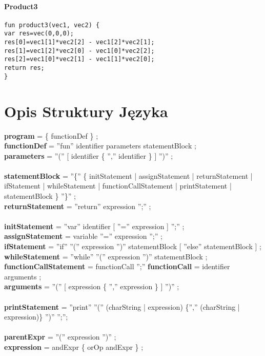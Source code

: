 \documentclass[11pt]{article} %
\begin{document}
\paragraph{Product3}
\begin{verbatim}
fun product3(vec1, vec2) {
var res=vec(0,0,0);
res[0]=vec1[1]*vec2[2] - vec1[2]*vec2[1];
res[1]=vec1[2]*vec2[0] - vec1[0]*vec2[2];
res[2]=vec1[0]*vec2[1] - vec1[1]*vec2[0];
return res;
}
\end{verbatim}

\section{Opis Struktury Języka}

\textbf{program} = \{ functionDef \} ;\\
\textbf{functionDef} = ''fun'' identifier parameters statementBlock ;\\
\textbf{parameters} = ''('' [ identifier \{ '','' identifier \} ] '')'' ;\\
\\
\textbf{statementBlock} = ''\{'' \{ initStatement | assignStatement | returnStatement |
ifStatement | whileStatement | functionCallStatement |  printStatement | statementBlock \} ''\}'' ;\\
\textbf{returnStatement} = ''return'' expression '';'' ;\\
\\
\textbf{initStatement} = ''var'' identifier [ ''='' expression ] '';'' ;\\
\textbf{assignStatement} = variable ''='' expression '';'' ;\\
\textbf{ifStatement} = ''if'' ''('' expression '')'' statementBlock [ ''else'' statementBlock ] ;\\
\textbf{whileStatement} = ''while'' ''('' expression '')'' statementBlock ;\\
\textbf{functionCallStatement} =  functionCall '';''
\textbf{functionCall} = identifier arguments ;\\
\textbf{arguments} = ''('' [ expression \{ '','' expression \} ] '')'' ;\\
\\
\textbf{printStatement} = ''print'' ''('' (charString | expression) \{'','' (charString | expression)\} '')'' '';'';\\
\\
\textbf{parentExpr} = ''('' expression '')'' ;\\
\textbf{expression} = andExpr \{ orOp andExpr \} ;\\
\end{document}
